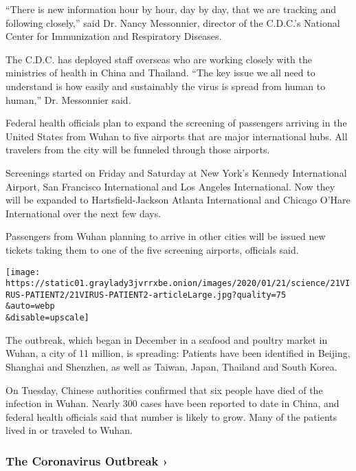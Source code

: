 ``There is new information hour by hour, day by day, that we are
tracking and following closely,'' said Dr. Nancy Messonnier, director of
the C.D.C.'s National Center for Immunization and Respiratory Diseases.

The C.D.C. has deployed staff overseas who are working closely with the
ministries of health in China and Thailand. ``The key issue we all need
to understand is how easily and sustainably the virus is spread from
human to human,'' Dr. Messonnier said.

Federal health officials plan to expand the screening of passengers
arriving in the United States from Wuhan to five airports that are major
international hubs. All travelers from the city will be funneled through
those airports.

Screenings started on Friday and Saturday at New York's Kennedy
International Airport, San Francisco International and Los Angeles
International. Now they will be expanded to Hartsfield-Jackson Atlanta
International and Chicago O'Hare International over the next few days.

Passengers from Wuhan planning to arrive in other cities will be issued
new tickets taking them to one of the five screening airports, officials
said.

\texttt{[image: https://static01.graylady3jvrrxbe.onion/images/2020/01/21/science/21VIRUS-PATIENT2/21VIRUS-PATIENT2-articleLarge.jpg?quality=75\\\&auto=webp\\\&disable=upscale]}

The outbreak, which began in December in a seafood and poultry market in
Wuhan, a city of 11 million, is spreading: Patients have been identified
in Beijing, Shanghai and Shenzhen, as well as Taiwan, Japan, Thailand
and South Korea.

On Tuesday, Chinese authorities confirmed that six people have died of
the infection in Wuhan. Nearly 300 cases have been reported to date in
China, and federal health officials said that number is likely to grow.
Many of the patients lived in or traveled to Wuhan.

\href{https://www.nytimes3xbfgragh.onion/news-event/coronavirus?action=click\&pgtype=Article\&state=default\&region=MAIN_CONTENT_3\&context=storylines_faq}{}

\hypertarget{the-coronavirus-outbreak-}{%
\subsubsection{The Coronavirus Outbreak
›}\label{the-coronavirus-outbreak-}}

